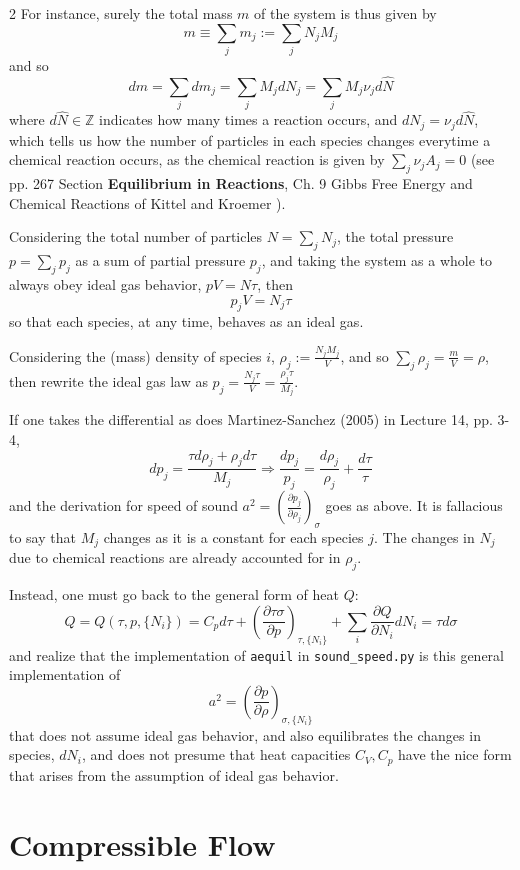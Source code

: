 \documentclass[10pt]{amsart}
\begin{document}
\begin{multicols*}{2}
For instance, surely the total mass $m$ of the system is thus given by
\[
m \equiv \sum_j m_j := \sum_j N_j M_j
\]
and so
\[
dm = \sum_j dm_j = \sum_j M_j dN_j = \sum_j M_j \nu_j d\widehat{N}
\]
where $d\widehat{N} \in \mathbb{Z}$ indicates how many times a reaction occurs, and $dN_j = \nu_j d\widehat{N}$, which tells us how the number of particles in each species changes everytime a chemical reaction occurs, as the chemical reaction is given by $\sum_j \nu_j A_j =0$ (see pp. 267 Section \textbf{Equilibrium in Reactions}, Ch. 9 Gibbs Free Energy and Chemical Reactions of Kittel and Kroemer \cite{CKittelHKroemer1980}).  

Considering the total number of particles $N = \sum_j N_j$, the total pressure $p = \sum_j p_j$ as a sum of partial pressure $p_j$, and taking the system as a whole to always obey ideal gas behavior, $pV=N\tau$, then
\[
p_j V= N_j \tau
\]
so that each species, at any time, behaves as an ideal gas. 

Considering the (mass) density of species $i$, $\rho_j := \frac{N_j M_j}{V}$, and so $\sum_j \rho_j = \frac{m}{V} = \rho$, then rewrite the ideal gas law as $p_j = \frac{N_j\tau}{V} = \frac{ \rho_j \tau }{M_j}$.  

If one takes the differential as does Martinez-Sanchez (2005) \cite{MMartinez-Sanchez2005} in Lecture 14, pp. 3-4, 
\[
dp_j = \frac{ \tau d\rho_j + \rho_j d\tau }{M_j} \Longrightarrow \frac{dp_j}{p_j} = \frac{d\rho_j}{\rho_j} + \frac{d\tau}{\tau}
\]
and the derivation for speed of sound $a^2 = \left( \frac{ \partial p_j}{ \partial \rho_j} \right)_{\sigma}$ goes as above.  It is fallacious to say that $M_j$ changes as it is a constant for each species $j$.  The changes in $N_j$ due to chemical reactions are already accounted for in $\rho_j$.  

Instead, one must go back to the general form of heat $Q$:
\[
Q = Q(\tau,p,\lbrace N_i \rbrace) = C_p d\tau + \left( \frac{ \partial \tau \sigma }{ \partial p} \right)_{\tau, \lbrace N_i \rbrace } + \sum_i \frac{ \partial Q}{ \partial N_i} dN_i = \tau d\sigma
\]
and realize that the implementation of \verb|aequil| in \verb|sound_speed.py| is this general implementation of 
\[
a^2 = \left( \frac{ \partial p }{ \partial \rho } \right)_{\sigma, \lbrace N_i \rbrace}
\]
that does not assume ideal gas behavior, and also equilibrates the changes in species, $dN_i$, and does not presume that heat capacities $C_V, C_p$ have the nice form that arises from the assumption of ideal gas behavior.  


\part{Compressible Flow}


\end{multicols*}
\end{document}
